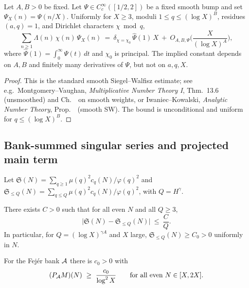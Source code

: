 \begin{lemma}\label{lem:LFSW}
Let $A,B>0$ be fixed. Let $\Psi\in C_c^\infty([1/2,2])$ be a fixed smooth bump and set $\Psi_X(n)=\Psi(n/X)$.
Uniformly for $X\ge 3$, moduli $1\le q\le (\log X)^B$, residues $(a,q)=1$, and Dirichlet characters $\chi\bmod q$,
\[
\sum_{n\ge 1}\Lambda(n)\,\chi(n)\,\Psi_X(n)\ =\ \delta_{\chi=\chi_0}\,\widehat\Psi(1)\,X\ +\ O_{A,B,\Psi}\!\Big(\frac{X}{(\log X)^A}\Big),
\]
where $\widehat\Psi(1)=\int_0^\infty \Psi(t)\,dt$ and $\chi_0$ is principal. The implied constant depends on $A,B$ and finitely many derivatives of $\Psi$, but not on $a,q,X$.
\end{lemma}

\begin{proof}[Proof]
This is the standard smooth Siegel–Walfisz estimate; see e.g.\ Montgomery–Vaughan, \emph{Multiplicative Number Theory I}, Thm.~13.6 (unsmoothed) and Ch.~~on smooth weights, or Iwaniec–Kowalski, \emph{Analytic Number Theory}, Prop.~~(smooth SW). The bound is unconditional and uniform for $q\le (\log X)^B$.
\end{proof}


\subsection{Bank-summed singular series and projected main term}\label{sec:sing-series-bank-ap}

Let $\mathfrak{S}(N)=\sum_{q\ge1}\mu(q)^2 c_q(N)/\varphi(q)^2$ and $\mathfrak{S}_{\le Q}(N)=\sum_{q\le Q}\mu(q)^2 c_q(N)/\varphi(q)^2$, with $Q=H^\gamma$.

\begin{proposition}\label{prop:truncation}
There exists $C>0$ such that for all even $N$ and all $Q\ge3$,
\[
\big|\mathfrak{S}(N)-\mathfrak{S}_{\le Q}(N)\big|\ \le\ \frac{C}{Q}.
\]
In particular, for $Q=(\log X)^{\gamma A}$ and $X$ large, $\mathfrak{S}_{\le Q}(N)\ge C_0>0$ uniformly in $N$.
\end{proposition}

\begin{corollary}\label{cor:projected-M}
For the Fejér bank $\mathcal{A}$ there is $c_0>0$ with
\[
(P_{\mathcal{A}} M)(N)\ \ge\ \frac{c_0}{\log^2 X}\qquad\text{for all even }N\in[X,2X].
\]
\end{corollary}

